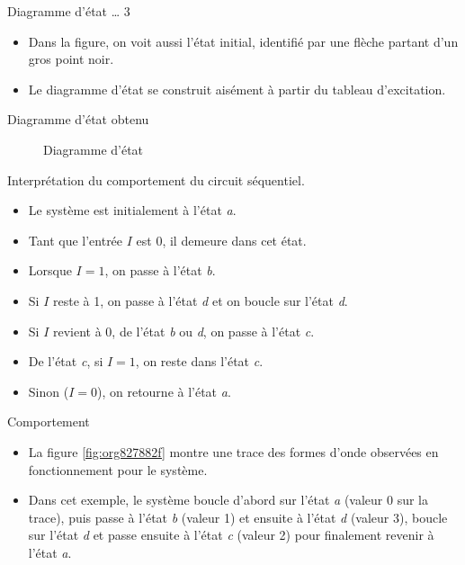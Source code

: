 \documentclass[presentation]{beamer}
\begin{document}
\begin{frame}[label={sec:org9a04483}]{Diagramme d'état \ldots{} 3}
\begin{itemize}
\item Dans la figure, on voit aussi l'état initial, identifié par une flèche partant d'un gros point noir.

\item Le diagramme d'état se construit aisément à partir du tableau d'excitation.
\end{itemize}
\end{frame}

\begin{frame}[label={sec:org3418fcf}]{Diagramme d'état obtenu}
\begin{figure}[htbp]
\centering

\caption{\label{fig:org9d5b4f3}Diagramme d'état}
\end{figure}
\end{frame}

\begin{frame}[label={sec:org86bcfe8}]{Interprétation du comportement du circuit séquentiel.}
\begin{itemize}
\item Le système est initialement à l'état \emph{a}.

\item Tant que l'entrée \(I\) est 0, il demeure dans cet état.

\item Lorsque \(I=1\), on passe à l'état \emph{b}.

\item Si \(I\) reste à 1, on passe à l'état \emph{d} et on boucle sur l'état \emph{d}.

\item Si \(I\) revient à 0, de l'état \emph{b} ou \emph{d}, on passe à l'état \emph{c}.

\item De l'état \emph{c}, si \(I = 1\), on reste dans l'état \emph{c}.

\item Sinon (\(I = 0\)), on retourne à l'état \emph{a}.
\end{itemize}
\end{frame}

\begin{frame}[label={sec:orgd630d44}]{Comportement}
\begin{itemize}
\item La figure \ref{fig:org827882f} montre une trace des formes d'onde observées en fonctionnement pour le système.

\item Dans cet exemple, le système boucle d'abord sur l'état \emph{a} (valeur 0 sur la trace), puis passe à l'état \emph{b} (valeur 1) et ensuite à l'état \emph{d} (valeur 3), boucle sur l'état \emph{d} et passe ensuite à l'état \emph{c} (valeur 2) pour finalement revenir à l'état \emph{a}.
\end{itemize}
\end{frame}
\end{document}

